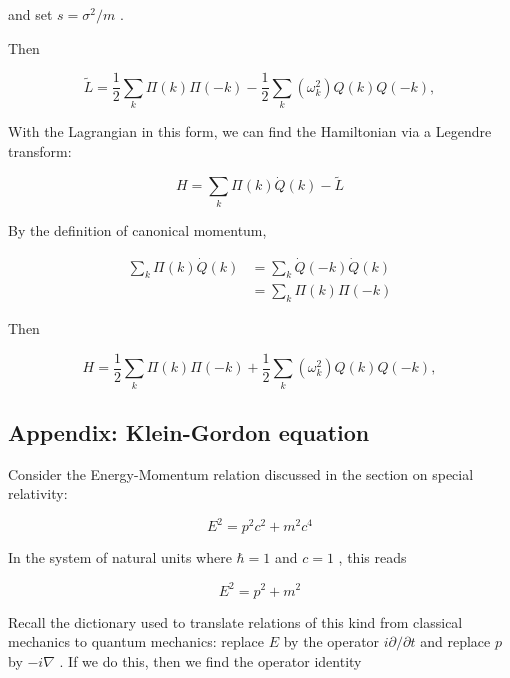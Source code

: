 and   set   $s = \sigma^2/m$ .



Then



\begin{equation}
\tilde L = \frac{1}{2} \sum_k \Pi (k) \Pi (-k)
-  \frac{1}{2} \sum_k (\omega_k^2 )Q(k) Q(-k),
\end{equation}


With  the  Lagrangian  in  this  form,  we  can  find  the  Hamiltonian  via  a  Legendre  transform:



\begin{equation}
H = \sum_k \Pi(k)\dot Q(k) - \tilde L
\end{equation}


By  the  definition  of  canonical  momentum,



\begin{align}
\sum_k \Pi(k)\dot Q(k) &= \sum_k \dot Q(-k)\dot Q(k) \\
&=\sum_k \Pi(k)\Pi(-k)
\end{align}


Then



\begin{equation}
H = \frac{1}{2} \sum_k \Pi(k) \Pi (-k)
+  \frac{1}{2} \sum_k  (\omega_k^2) Q(k) Q(-k),
\end{equation}


 \subsection{Appendix:  Klein-Gordon  equation}

Consider  the  Energy-Momentum  relation  discussed  in  the  section  on  special  relativity:



\begin{equation}
E^2 = p^2 c^2 + m^2 c^4
\end{equation}


In  the  system  of  natural  units  where   $\hbar = 1$  and   $c = 1$ ,  this  reads



\begin{equation}
\label{kg-energy-momentum-relation}
E^2 = p^2 + m^2
\end{equation}


Recall  the  dictionary  used  to  translate  relations  of  this  kind  from  classical  mechanics  to  quantum  mechanics:  replace   $E$  by  the  operator   $i\partial/\partial t$  and  replace   $p$  by   $-i\nabla$ .   If  we  do  this,  then  we  find  the  operator  identity



